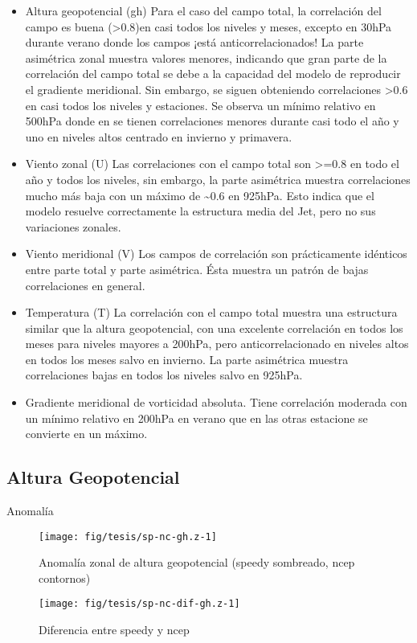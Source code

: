 \documentclass[spanish,a4paper]{book}
\begin{document}
\begin{itemize}
\item
  Altura geopotencial (gh) Para el caso del campo total, la correlación
  del campo es buena (\textgreater{}0.8)en casi todos los niveles y
  meses, excepto en 30hPa durante verano donde los campos ¡está
  anticorrelacionados! La parte asimétrica zonal muestra valores
  menores, indicando que gran parte de la correlación del campo total se
  debe a la capacidad del modelo de reproducir el gradiente meridional.
  Sin embargo, se siguen obteniendo correlaciones \textgreater{}0.6 en
  casi todos los niveles y estaciones. Se observa un mínimo relativo en
  500hPa donde en se tienen correlaciones menores durante casi todo el
  año y uno en niveles altos centrado en invierno y primavera.
\item
  Viento zonal (U) Las correlaciones con el campo total son
  \textgreater{}=0.8 en todo el año y todos los niveles, sin embargo, la
  parte asimétrica muestra correlaciones mucho más baja con un máximo de
  \textasciitilde{}0.6 en 925hPa. Esto indica que el modelo resuelve
  correctamente la estructura media del Jet, pero no sus variaciones
  zonales.
\item
  Viento meridional (V) Los campos de correlación son prácticamente
  idénticos entre parte total y parte asimétrica. Ésta muestra un patrón
  de bajas correlaciones en general.
\item
  Temperatura (T) La correlación con el campo total muestra una
  estructura similar que la altura geopotencial, con una excelente
  correlación en todos los meses para niveles mayores a 200hPa, pero
  anticorrelacionado en niveles altos en todos los meses salvo en
  invierno. La parte asimétrica muestra correlaciones bajas en todos los
  niveles salvo en 925hPa.
\item
  Gradiente meridional de vorticidad absoluta. Tiene correlación
  moderada con un mínimo relativo en 200hPa en verano que en las otras
  estacione se convierte en un máximo.
\end{itemize}

\subsection{Altura Geopotencial}\label{altura-geopotencial-1}

Anomalía

\begin{figure}

{\centering \texttt{[image: fig/tesis/sp-nc-gh.z-1]} 

}

\caption{Anomalía zonal de altura geopotencial (speedy sombreado, ncep contornos)}\label{fig:sp-nc-gh.z}
\end{figure}\begin{figure}

{\centering \texttt{[image: fig/tesis/sp-nc-dif-gh.z-1]} 

}

\caption{Diferencia entre speedy y ncep}\label{fig:sp-nc-dif-gh.z}
\end{figure}
\end{document}
